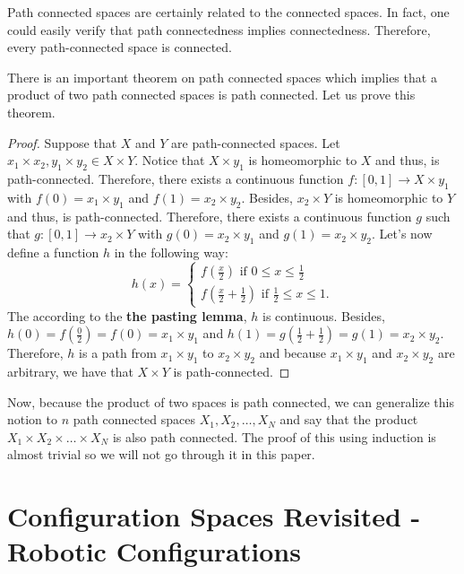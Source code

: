 \documentclass[12pt]{article}
\theoremstyle{definition}
\begin{document}
Path connected spaces are certainly related to the connected spaces.
\cite{10} In fact, one could easily verify that path connectedness implies connectedness.
Therefore, every path-connected space is connected.

\bigskip

There is an important theorem on path connected spaces which implies that a product of two path connected spaces is path connected.
Let us prove this theorem.

\begin{proof}
Suppose that $X$ and $Y$ are path-connected spaces.
Let $x_1 \times x_2, y_1 \times y_2 \in X \times Y$.
Notice that $X \times y_1$ is homeomorphic to $X$
and thus, is path-connected. Therefore, there exists
a continuous function $f : [0, 1] \to X \times y_1$
with $f(0) = x_1 \times y_1$ and $f(1) = x_2 \times y_2$.
Besides, $x_2 \times Y$ is homeomorphic to $Y$ and thus,
is path-connected. Therefore, there exists a continuous
function $g$ such that $g : [0, 1] \to x_2 \times Y$
with $g(0) = x_2 \times y_1$ and $g(1) = x_2 \times y_2$.
Let's now define a function $h$ in the following way:
$$
h(x) = 
\begin{cases}
f(\frac{x}{2}) \mbox{ if } 0 \leq x \leq \frac{1}{2}\\
f(\frac{x}{2} + \frac{1}{2}) \mbox{ if } \frac{1}{2} \leq x \leq 1.
\end{cases}
$$
The according to the \cite{11} \textbf{the pasting lemma},
$h$ is continuous. Besides, $h(0) = f(\frac{0}{2}) = f(0) = x_1 \times y_1$
and $h(1) = g(\frac{1}{2} + \frac{1}{2}) = g(1) = x_2 \times y_2$.
Therefore, $h$ is a path from $x_1 \times y_1$ to $x_2 \times y_2$
and because $x_1 \times y_1$ and $x_2 \times y_2$ are arbitrary, we have that
$X \times Y$ is path-connected.
\end{proof}

Now, because the product of two spaces is path connected, we can generalize this
notion to $n$ path connected spaces $X_1, X_2, \dots, X_N$ and say that the product
$X_1 \times X_2 \times \dots \times X_N$ is also path connected. The proof of this
using induction is almost trivial so we will not go through it in this paper.


\section*{\centering Configuration Spaces Revisited - Robotic Configurations}
\end{document}
